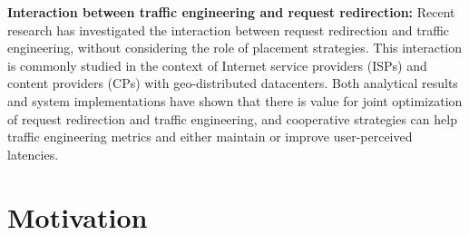 
\textbf{Interaction between traffic engineering and request redirection:} Recent research has investigated the interaction between request redirection and traffic engineering, without considering the role of placement strategies. This interaction is commonly studied in the context of Internet service providers (ISPs) and content providers (CPs) with geo-distributed datacenters. Both analytical results \cite{Jiang2009,JohariGameTheory} and system implementations \cite{CATE,P4P} have shown that there is value for joint optimization of request redirection and traffic engineering, and cooperative strategies can help traffic engineering metrics and either maintain or improve user-perceived latencies.

%


\section{Motivation}
\label{sec:bg-motivation}

